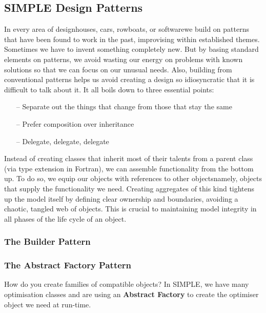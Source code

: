 \documentclass[a4paper,11pt]{article}
\begin{document}
\subsection{SIMPLE Design Patterns}
In every area of design\textemdash{}houses, cars, rowboats, or software\textemdash{}we build on patterns that have been found to work in the past, improvising within established themes. Sometimes we have to invent something completely new. But by basing standard elements on patterns, we avoid wasting our energy on problems with known solutions so that we can focus on our unusual needs. Also, building from conventional patterns helps us avoid creating a design so idiosyncratic that it is difficult to talk about it. It all boils down to three essential points:
\begin{itemize}
    \item[--] Separate out the things that change from those that stay the same
    \item[--] Prefer composition over inheritance
    \item[--] Delegate, delegate, delegate
\end{itemize}
Instead of creating classes that inherit most of their talents from a parent class (via type extension in Fortran), we can assemble functionality from the bottom up. To do so, we equip our objects with references to other objects\textemdash{}namely, objects that supply the functionality we need. Creating aggregates of this kind tightens up the model itself by defining clear ownership and boundaries, avoiding a chaotic, tangled web of objects. This is crucial to maintaining model integrity in all phases of the life cycle of an object.


\subsubsection{The Builder Pattern}




\subsubsection{The Abstract Factory Pattern}
How do you create families of compatible objects? In SIMPLE, we have many optimisation classes and are using an \textbf{Abstract Factory} to create the optimiser object we need at run-time. 
\end{document}

